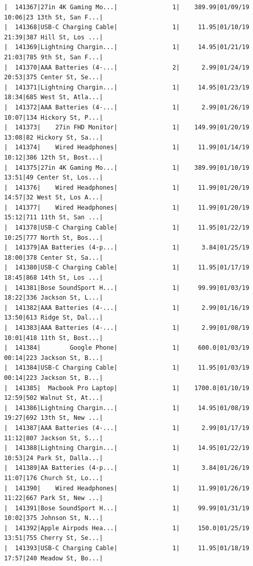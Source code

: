 \documentclass[
  letterpaper,
  DIV=11,
  numbers=noendperiod]{scrartcl}
\begin{document}
\begin{verbatim}
|  141367|27in 4K Gaming Mo...|               1|    389.99|01/09/19 10:06|23 13th St, San F...|
|  141368|USB-C Charging Cable|               1|     11.95|01/10/19 21:39|387 Hill St, Los ...|
|  141369|Lightning Chargin...|               1|     14.95|01/21/19 21:03|785 9th St, San F...|
|  141370|AAA Batteries (4-...|               2|      2.99|01/24/19 20:53|375 Center St, Se...|
|  141371|Lightning Chargin...|               1|     14.95|01/23/19 18:34|685 West St, Atla...|
|  141372|AAA Batteries (4-...|               1|      2.99|01/26/19 10:07|134 Hickory St, P...|
|  141373|    27in FHD Monitor|               1|    149.99|01/20/19 13:08|82 Hickory St, Sa...|
|  141374|    Wired Headphones|               1|     11.99|01/14/19 10:12|386 12th St, Bost...|
|  141375|27in 4K Gaming Mo...|               1|    389.99|01/10/19 13:51|49 Center St, Los...|
|  141376|    Wired Headphones|               1|     11.99|01/20/19 14:57|32 West St, Los A...|
|  141377|    Wired Headphones|               1|     11.99|01/20/19 15:12|711 11th St, San ...|
|  141378|USB-C Charging Cable|               1|     11.95|01/22/19 10:25|777 North St, Bos...|
|  141379|AA Batteries (4-p...|               1|      3.84|01/25/19 18:00|378 Center St, Sa...|
|  141380|USB-C Charging Cable|               1|     11.95|01/17/19 18:45|868 14th St, Los ...|
|  141381|Bose SoundSport H...|               1|     99.99|01/03/19 18:22|336 Jackson St, L...|
|  141382|AAA Batteries (4-...|               1|      2.99|01/16/19 13:50|613 Ridge St, Dal...|
|  141383|AAA Batteries (4-...|               1|      2.99|01/08/19 10:01|418 11th St, Bost...|
|  141384|        Google Phone|               1|     600.0|01/03/19 00:14|223 Jackson St, B...|
|  141384|USB-C Charging Cable|               1|     11.95|01/03/19 00:14|223 Jackson St, B...|
|  141385|  Macbook Pro Laptop|               1|    1700.0|01/10/19 12:59|502 Walnut St, At...|
|  141386|Lightning Chargin...|               1|     14.95|01/08/19 19:27|692 13th St, New ...|
|  141387|AAA Batteries (4-...|               1|      2.99|01/17/19 11:12|807 Jackson St, S...|
|  141388|Lightning Chargin...|               1|     14.95|01/22/19 10:53|24 Park St, Dalla...|
|  141389|AA Batteries (4-p...|               1|      3.84|01/26/19 11:07|176 Church St, Lo...|
|  141390|    Wired Headphones|               1|     11.99|01/26/19 11:22|667 Park St, New ...|
|  141391|Bose SoundSport H...|               1|     99.99|01/31/19 10:02|375 Johnson St, N...|
|  141392|Apple Airpods Hea...|               1|     150.0|01/25/19 13:51|755 Cherry St, Se...|
|  141393|USB-C Charging Cable|               1|     11.95|01/18/19 17:57|240 Meadow St, Bo...|

\end{verbatim}
\end{document}
